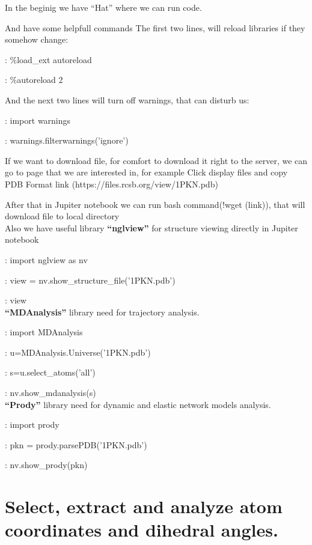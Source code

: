 \documentclass{article}
\begin{document}
In the beginig we have ``Hat'' where we can run code.

And have some helpfull commands
The first two lines, will reload libraries if they somehow change:

: \%load\_ext autoreload

: \%autoreload 2
 
And the next two lines will turn off warnings, that can disturb us:

: import warnings

: warnings.filterwarnings('ignore')


    If we want to download file, for comfort to download it right to the server, we can go to page that we are interested in, for example \href{https://www.rcsb.org/structure/1PKN}{}
Click display files and copy PDB Format link (https://files.rcsb.org/view/1PKN.pdb)

After that in Jupiter notebook we can run bash command(!wget (link)), that will download file to local directory \\

    Also we have useful library \textbf{``nglview''} for structure viewing directly in Jupiter notebook 

: import nglview as nv

: view = nv.show\_structure\_file('1PKN.pdb')

: view \\

    \textbf{``MDAnalysis''} library need for trajectory analysis.

: import MDAnalysis

: u=MDAnalysis.Universe('1PKN.pdb')

: s=u.select\_atoms('all')

: nv.show\_mdanalysis(s)\\


    \textbf{``Prody''} library need for dynamic and elastic network models analysis.

: import prody

: pkn = prody.parsePDB('1PKN.pdb')

: nv.show\_prody(pkn)\\







\section{Select, extract and analyze atom coordinates and dihedral angles.}
\end{document}
